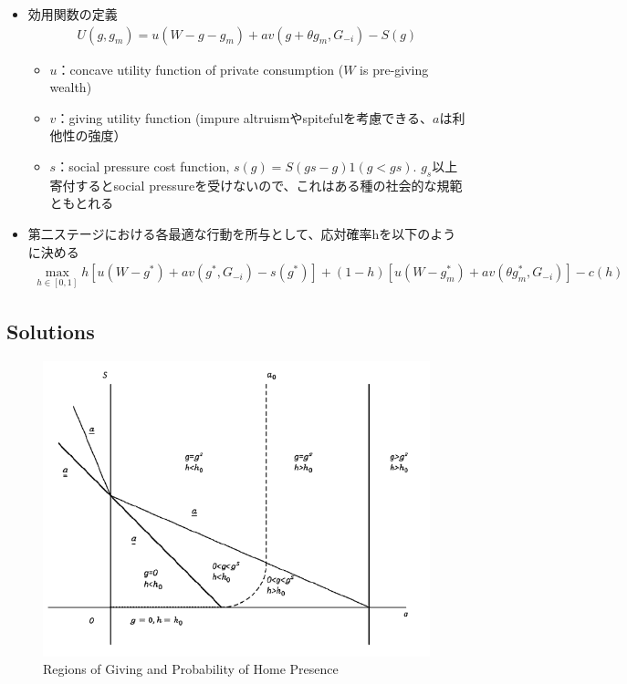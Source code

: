 \documentclass[../root]{subfiles}
\begin{document}
    \begin{itemize}
        \item 効用関数の定義
        \begin{align*}
            U(g, g_m) = u(W - g - g_m) + av(g + \theta g_m, G_{-i}) - S(g)
        \end{align*}
        \begin{itemize}
            \item $u$：concave utility function of private consumption ($W$ is pre-giving wealth)
            \item $v$：giving utility function (impure altruismやspitefulを考慮できる、$a$は利他性の強度）
            \item $s$：social pressure cost function, $s(g) = S(gs - g) 1(g < gs)$. $g_s$以上寄付するとsocial pressureを受けないので、これはある種の社会的な規範ともとれる 
        \end{itemize}
        \item 第二ステージにおける各最適な行動を所与として、応対確率hを以下のように決める
        \begin{align*}
            \max_{h \in [0,1]} h[u(W-g^*) + a v(g^*, G_{-i}) - s(g^*)] + (1-h)[u(W - g^*_m) + av(\theta g^*_m, G_{-i})] - c(h)
        \end{align*}
    \end{itemize}

    \subsection{Solutions}

    \begin{figure}[t]
        \centering
        \includegraphics[width = .8\linewidth]{0821kato/fig1_2.png}
        \caption{Regions of Giving and Probability of Home Presence}
        \label{}
    \end{figure}
\end{document}
